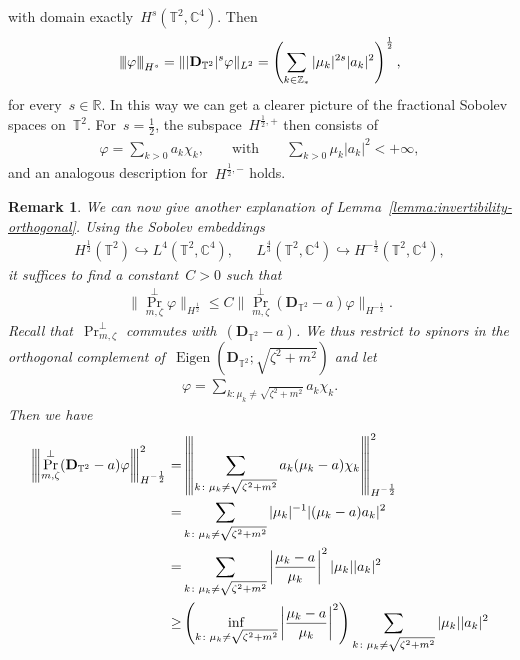 \documentclass[10pt,a4paper]{amsart}
\newcommand{\tnorm}[1]{%
  \left\vert\kern-0.3ex\left\vert\kern-0.3ex\left\vert #1 \right\vert\kern-0.3ex\right\vert\kern-0.3ex\right\vert
}
\newcommand{\R}{\mathbb{R}}
\newcommand{\C}{\mathbb{C}}
\newcommand{\T}{\mathbb{T}}
\newcommand{\pD}{\mathbf{D}}
\newcommand{\parenthesis}[1]{\left(#1\right)} %
\DeclareMathOperator{\Eigen}{Eigen}
\DeclareMathOperator{\proj}{Pr}
\newtheorem{rmk}[thm]{Remark}
\begin{document}
with domain exactly~$H^{s}(\T^2,\C^4)$. Then
\begin{align}
    \tnorm{\varphi}_{H^s}
    =
    \||\pD_{\T^2}|^s\varphi\|_{L^2}
    =
    \parenthesis{
        \sum_{k\in\mathbb Z_*}|\mu_k|^{2s}|a_k|^2
    }^{\frac12},
\end{align}
for every~$s\in\R$.
In this way we can get a clearer picture of the fractional Sobolev spaces on~$\T^2$.
For~$s=\frac{1}{2}$, the subspace~$H^{\frac{1}{2},+}$ then consists of 
\begin{align}
    \varphi=\sum_{k>0} a_k \chi_k, & & \mbox{ with } & & \sum_{k>0}\mu_k |a_k|^2<+\infty,
\end{align}
and an analogous description for~$H^{\frac{1}{2},-}$ holds. 

 

\begin{rmk}\label{rmk:resolvent-estimate}
    We can now give another explanation of Lemma~\ref{lemma:invertibility-orthogonal}. 
    Using the Sobolev embeddings
    \begin{align}
    H^{\frac{1}{2}}(\T^2)\hookrightarrow L^4(\T^2,\C^4), & & L^{\frac{4}{3}}(\T^2,\C^4)\hookrightarrow H^{-\frac{1}{2}}(\T^2,\C^4),
    \end{align}
    it suffices to find a constant~$C>0$ such that
    \begin{align}
    \|\proj_{m,\zeta}^\perp \varphi\|_{H^{\frac{1}{2}}}\leq C\|\proj_{m,\zeta}^\perp(\pD_{\T^2}-a)\varphi\|_{H^{-\frac{1}{2}}}.
    \end{align}
    Recall that~$\proj_{m,\zeta}^\perp$ commutes with~$(\pD_{\T^2}-a)$.
    We thus restrict to spinors in the orthogonal complement of~$\Eigen(\pD_{\T^2};\sqrt{\zeta^2+m^2})$ and let 
    \begin{align}
    \varphi=\sum_{k\colon \mu_k\neq\sqrt{\zeta^2+m^2}}a_k \chi_k.
    \end{align}
    Then we have 
    \begin{align}
        \tnorm{\proj_{m,\zeta}^\perp(\pD_{\T^2}-a)\varphi }_{H^{-\frac{1}{2}}}^2
        =&\tnorm{ \sum_{k\colon \mu_k\neq\sqrt{\zeta^2+m^2}} a_k(\mu_k-a) \chi_k }_{H^{-\frac{1}{2}}}^2 \\
        =&\sum_{k\colon \mu_k\neq\sqrt{\zeta^2+m^2}}|\mu_k|^{-1}|(\mu_k-a)a_k|^2 \\
        =&\sum_{k\colon\mu_k\neq\sqrt{\zeta^2+m^2}} \left|\frac{\mu_k-a}{\mu_k}\right|^2 |\mu_k| |a_k|^2 \\
        \geq& \parenthesis{ \inf_{k\colon \mu_k\neq\sqrt{\zeta^2+m^2}} \left|\frac{\mu_k-a}{\mu_k}\right|^2  } \sum_{k\colon\mu_k\neq \sqrt{\zeta^2+m^2}} |\mu_k| |a_k|^2\\

\end{align}
\end{rmk}
\end{document}
